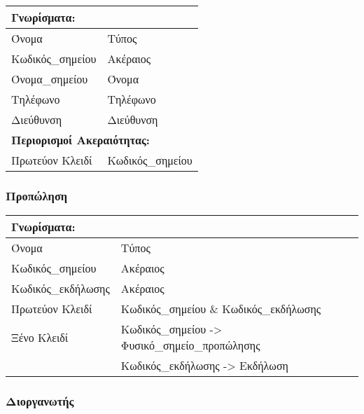 \begin{tabular}{|p{6cm}|p{8cm}|}
  \multicolumn{2}{l}{\textbf{Γνωρίσματα:}}               \\ \hline
  Όνομα            & Τύπος                               \\ \hline
  Κωδικός\_σημείου & Ακέραιος                            \\ \hline
  Όνομα\_σημείου   & Όνομα                               \\ \hline
  Τηλέφωνο         & Τηλέφωνο                            \\ \hline
  Διεύθυνση        & Διεύθυνση                           \\ \hline
  \multicolumn{2}{l}{\textbf{Περιορισμοί Ακεραιότητας:}} \\ \hline
  Πρωτεύον Κλειδί  & Κωδικός\_σημείου                    \\ \hline
\end{tabular}

\subsubsection{Προπώληση}

\begin{tabular}{|p{6cm}|p{8cm}|}
  \multicolumn{2}{l}{\textbf{Γνωρίσματα:}}                    \\ \hline
  Όνομα              & Τύπος                                  \\ \hline
  Κωδικός\_σημείου   & Ακέραιος                               \\ \hline
  Κωδικός\_εκδήλωσης & Ακέραιος                               \\ \hline
  Πρωτεύον Κλειδί    & Κωδικός\_σημείου \& Κωδικός\_εκδήλωσης \\ \hline
  Ξένο Κλειδί        & Κωδικός\_σημείου -> Φυσικό\_σημείο\_προπώλησης
                                                              \\ \hline
                     & Κωδικός\_εκδήλωσης -> Εκδήλωση         \\ \hline
\end{tabular}


\subsubsection{Διοργανωτής}

